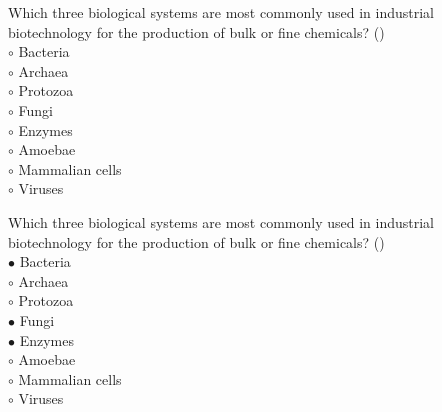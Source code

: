 \documentclass[]{beamer}
\begin{document}
\begin{CJK}{UTF8}{gbsn}
\begin{frame}[shrink] {}
\addtocounter{questions}{1}
\color{blue}
Which three biological systems are most commonly used in industrial biotechnology for the production of bulk or fine chemicals?
({})\\
\color{black}
\setlength{\parindent}{-0.4cm}
{\color{red}$\circ$}  Bacteria   \\
{\color{red}$\circ$} Archaea   \\
{\color{red}$\circ$} Protozoa  \\
{\color{red}$\circ$}  Fungi  \\
{\color{red}$\circ$}  Enzymes  \\
{\color{red}$\circ$} Amoebae  \\
{\color{red}$\circ$} Mammalian cells  \\
{\color{red}$\circ$} Viruses  \\
\end{frame}
\begin{frame}[shrink] {}
\addtocounter{answers}{1}
\color{blue}
Which three biological systems are most commonly used in industrial biotechnology for the production of bulk or fine chemicals?
({})\\
\color{black}
\setlength{\parindent}{-0.4cm}
{\color{red}$\bullet$} Bacteria   \\
{\color{red}$\circ$} Archaea   \\
{\color{red}$\circ$} Protozoa  \\
{\color{red}$\bullet$} Fungi  \\
{\color{red}$\bullet$} Enzymes  \\
{\color{red}$\circ$} Amoebae  \\
{\color{red}$\circ$} Mammalian cells  \\
{\color{red}$\circ$} Viruses  \\
\end{frame}



\end{CJK}
\end{document}
